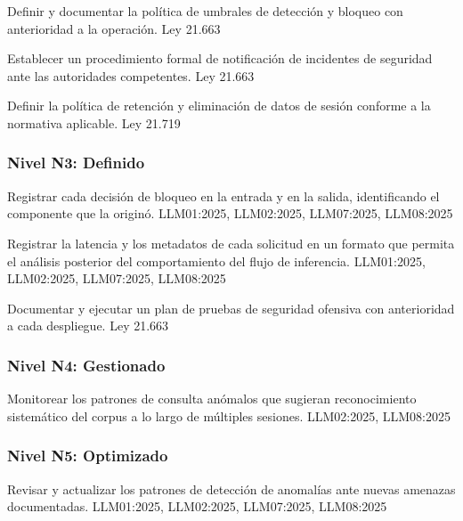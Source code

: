   {Definir y documentar la política de umbrales de detección y bloqueo con anterioridad a la operación.}
  {Ley 21.663}

  {Establecer un procedimiento formal de notificación de incidentes de seguridad ante las autoridades competentes.}
  {Ley 21.663}

  {Definir la política de retención y eliminación de datos de sesión conforme a la normativa aplicable.}
  {Ley 21.719}

\subsubsection*{Nivel N3: Definido}

  {Registrar cada decisión de bloqueo en la entrada y en la salida, identificando el componente que la originó.}
  {LLM01:2025, LLM02:2025, LLM07:2025, LLM08:2025}

  {Registrar la latencia y los metadatos de cada solicitud en un formato que permita el análisis posterior del comportamiento del flujo de inferencia.}
  {LLM01:2025, LLM02:2025, LLM07:2025, LLM08:2025}

  {Documentar y ejecutar un plan de pruebas de seguridad ofensiva con anterioridad a cada despliegue.}
  {Ley 21.663}

\subsubsection*{Nivel N4: Gestionado}

  {Monitorear los patrones de consulta anómalos que sugieran reconocimiento sistemático del corpus a lo largo de múltiples sesiones.}
  {LLM02:2025, LLM08:2025}

\subsubsection*{Nivel N5: Optimizado}

  {Revisar y actualizar los patrones de detección de anomalías ante nuevas amenazas documentadas.}
  {LLM01:2025, LLM02:2025, LLM07:2025, LLM08:2025}

